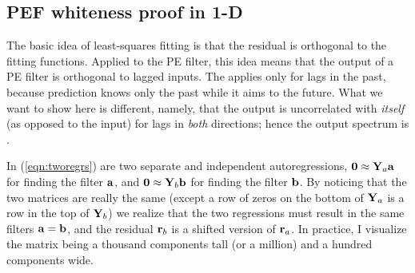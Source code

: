 \subsection{PEF whiteness proof in 1-D}
\par
\label{mda/'white_proof'}
The basic idea of least-squares fitting
is that the residual is orthogonal to the fitting functions.
Applied to the PE filter, this idea means
that the output of a PE filter is orthogonal to lagged inputs.
The  applies only for lags in the past,
because prediction knows only the past while it aims to the future.
What we want to show here is different,
namely, that the output is uncorrelated with {\it itself}
(as opposed to the input) for lags in {\it both} directions;
hence the output spectrum is .

\par
In (\ref{eqn:tworegrs}) are two separate and independent autoregressions,
$\bold 0\approx\bold Y_a\bold a$
for finding the filter $\bold a$,
and
$\bold 0\approx\bold Y_b\bold b$
for finding the filter $\bold b$.
By noticing that the two matrices are really the same
(except a row of zeros on the bottom of
$\bold Y_a$
is a row in the top of
$\bold Y_b$)
we realize that the two regressions must result in the same filters
$\bold a =\bold b$,
and the residual $\bold r_b$ is a shifted version of $\bold r_a$.
In practice, I visualize the matrix being a thousand components tall
(or a million)
and a hundred components wide.
